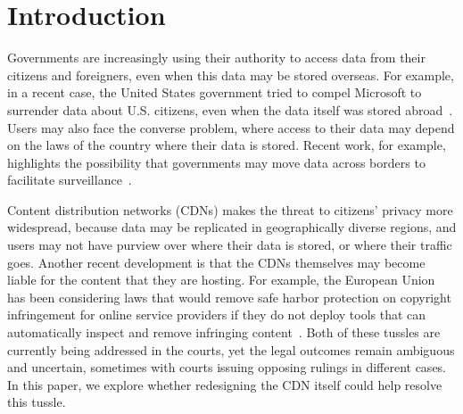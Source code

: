 \section{Introduction}
\label{sec:intro}

Governments are increasingly using their authority to access data from
their citizens and foreigners, even when this data may be stored overseas.  For
example, in a
recent case, the United States government tried to compel Microsoft to
surrender data about U.S. citizens, even when the data itself was stored
abroad~\cite{microsoft_ireland}. Users may also face the converse problem, where access to their data
may depend on the laws of the country where their data is stored. Recent work,
for example, highlights the possibility that governments may move data across
borders to facilitate surveillance~\cite{arnbak2015loopholes}.  

Content distribution networks (CDNs) makes the threat to citizens'
privacy more widespread, because data may be replicated in geographically
diverse regions, and users may not have purview over where their data is
stored, or where their traffic goes. Another recent development is that the
CDNs themselves may become liable for the content that they are hosting. For
example, the European Union has been considering laws that would remove safe
harbor protection on copyright infringement for online service providers if
they do not deploy tools that can automatically inspect and remove infringing
content~\cite{eu-copyright}. Both of these tussles are currently being
addressed in the courts, yet the legal outcomes remain ambiguous and
uncertain, sometimes with courts issuing opposing rulings in different cases.
In this paper, we explore whether redesigning the CDN itself could help
resolve this tussle.


